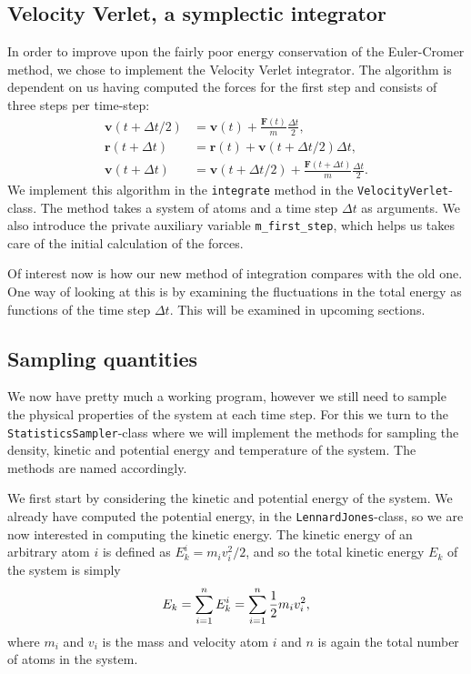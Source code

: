 \documentclass[a4paper]{article}
\renewcommand{\vec}[1]{\mathbf{#1}}
\begin{document}
    \subsection{Velocity Verlet, a symplectic integrator}
    \label{sub:velocity_verlet_a_symplectic_integrator}
    
    In order to improve upon the fairly poor energy conservation of the
    Euler-Cromer method, we chose to implement the Velocity Verlet integrator.
    The algorithm is dependent on us having computed the forces for the first
    step and consists of three steps per time-step:
    \begin{align*}
        \vec{v}(t + \Delta t/2) &= \vec{v}(t) + \frac{\vec{F}(t)}{m}\frac{\Delta t}{2},\\
        \vec{r}(t + \Delta t) &= \vec{r}(t) + \vec{v}(t + \Delta t/2)\Delta t, \\
        \vec{v}(t + \Delta t) &= \vec{v}(t + \Delta t/2) + \frac{\vec{F}(t+\Delta t)}{m} \frac{\Delta t}{2}.
    \end{align*}
    We implement this algorithm in the \texttt{integrate} method in the
    \texttt{VelocityVerlet}-class. The method takes a system of atoms and a
    time step $\Delta t$ as arguments. We also introduce the private auxiliary
    variable \texttt{m\_first\_step}, which helps us takes care of the initial
    calculation of the forces.
    
    Of interest now is how our new method of integration compares with the old
    one. One way of looking at this is by examining the fluctuations in the
    total energy as functions of the time step $\Delta t$. This will be
    examined in upcoming sections.
    
    \subsection{Sampling quantities}
    \label{sub:sampling_quantities}
   
    We now have pretty much a working program, however we still need to sample
    the physical properties of the system at each time step. For this we turn
    to the \texttt{StatisticsSampler}-class where we will implement the methods
    for sampling the density, kinetic and potential energy and temperature of
    the system. The methods are named accordingly.
    
    We first start by considering the kinetic and potential energy of the
    system. We already have computed the potential energy, in the
    \texttt{LennardJones}-class, so we are now interested in computing the
    kinetic energy. The kinetic energy of an arbitrary atom $i$ is defined as
    $E_{k}^i = m_iv_i^2/2$, and so the total kinetic energy $E_k$ of the system
    is simply
    \begin{equation}
        \notag
        E_k = \sum^{n}_{i=1} E_k^i = \sum^{n}_{i=1} \frac{1}{2}m_iv_i^2,
    \end{equation}
    where $m_i$ and $v_i$ is the mass and velocity atom $i$ and $n$ is again
    the total number of atoms in the system.
    
\end{document}
